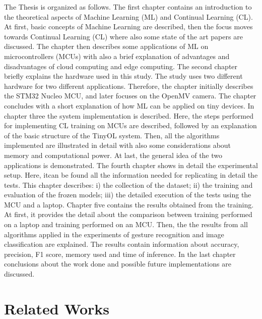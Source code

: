 \documentclass[12pt]{report}
\begin{document}
The Thesis is organized as follows. The first chapter contains an introduction to the theoretical aspects of Machine Learning (ML) and Continual Learning (CL). At first, basic concepts of Machine Learning are described, then the focus moves towards Continual Learning (CL) where also some state of the art papers are discussed. The chapter then describes some applications of ML on microcontrollers (MCUs) with also a brief explanation of advantages and disadvantages of cloud computing and edge computing. The second chapter briefly explains the hardware used in this study. The study uses two different hardware for two different applications. Therefore, the chapter initially describes the STM32 Nucleo MCU, and later focuses on the OpenMV camera. The chapter concludes with a short explanation of how ML can be applied on tiny devices. In chapter three the system implementation is described. Here, the steps performed for implementing CL training on MCUs are described, followed by an explanation of the basic structure of the TinyOL system. Then, all the algorithms implemented are illustrated in detail with also some considerations about memory and computational power. At last, the general idea of the two applications is demonstrated. The fourth chapter shows in detail the experimental setup. Here, itcan be found all the information needed for replicating in detail the tests. This chapter describes: i) the collection of the dataset; ii) the training and evaluation of the frozen models; iii) the detailed execution of the tests using the MCU and a laptop. Chapter five contains the results obtained from the training. At first, it provides the detail about the comparison between training performed on a laptop and training performed on an MCU. Then, the the results from all algorithms applied in the experiments of gesture recognition and image classification are explained. The results contain information about accuracy, precision, F1 score, memory used and time of inference. In the last chapter conclusions about the work done and possible future implementations are discussed.


\chapter{Related Works} \label{chap:relworks}
\end{document}
